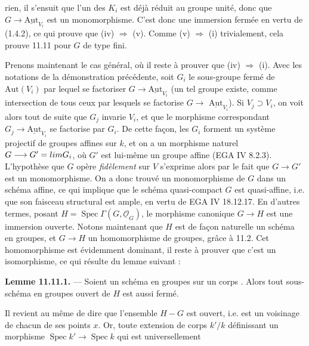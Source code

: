 \documentclass[11pt,a4paper]{article}
\begin{document}
rien, il s'ensuit que l'un des $K_{i}$ est déjà réduit au groupe unité,
donc que $G \to \underline{\mathrm{Aut}}_{V_{i}}$ est un monomorphisme.
C'est donc une immersion fermée en vertu de (1.4.2), ce qui prouve que
(iv) $\Rightarrow$ (v). Comme (v) $\Rightarrow$ (i) trivialement, cela
prouve 11.11 pour $G$ de type fini.

Prenons maintenant le cas général, où il reste à prouver que (iv)
$\Rightarrow$ (i). Avec les notations de la démonstration précédente, soit
$G_{i}$ le  sous-groupe fermé de
$\mathrm{Aut}(V_{i})$ par lequel  se factoriser
$G \to \underline{\mathrm{Aut}}_{V_{i}}$  (un tel groupe
existe,  comme intersection de tous ceux par lesquels se
factorise $G \to{}$ \struck{\ill{}} $\underline{\mathrm{Aut}}_{V_{i}}$). Si
$V_{j} \supset V_{i}$, on voit alors tout de suite que $G_{j}$ invarie
$V_{i}$, et que le morphisme correspondant
$G_{j} \to \underline{\mathrm{Aut}}_{V_{i}}$ se factorise par $G_{i}$. De
cette façon, les $G_{i}$ forment un système projectif de groupes affines
sur $k$, et on a un morphisme naturel
$G \longrightarrow G' = \varprojlim G_{i}$, où $G'$ est lui-même un groupe
affine (EGA IV 8.2.3). L'hypothèse que $G$ opère \emph{fidèlement} sur $V$
s'exprime alors par le fait que $G \to G'$ est un monomorphisme. On a donc
trouvé un monomorphisme de $G$ dans un schéma affine, ce qui implique que
le schéma quasi-compact  $G$ est quasi-affine, i.e. que son
faisceau structural est ample, en vertu de EGA IV 18.12.17. En d'autres
termes, posant $H = \operatorname{Spec} \Gamma(G, \underline{\mathcal{O}}_{G})$,
le morphisme canonique $G \to H$ est une immersion ouverte. Notons
maintenant que $H$ est de façon naturelle un schéma en groupes, et
$G \to H$ un homomorphisme de groupes, grâce à 11.2. Cet homomorphisme est
évidemment dominant, il reste à prouver que c'est un isomorphisme, ce qui
résulte \struck{\ill{}} du lemme suivant :

\textbf{Lemme 11.11.1.} — Soient  un schéma en groupes
sur un corps  \struck{\ill{}}. Alors tout sous-schéma en groupes
ouvert  de $H$ est aussi fermé.

Il revient au même de dire que l'ensemble $H - G$ est ouvert, i.e. est un
voisinage de chacun de ses points $x$. Or, toute extension de corps $k'/k$
définissant un morphisme $\operatorname{Spec} k' \to \operatorname{Spec} k$
qui est universellement

\end{document}
